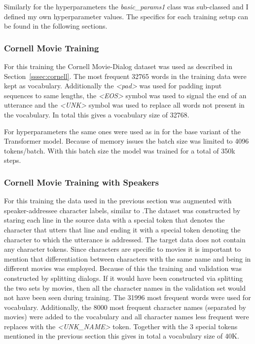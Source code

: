 \documentclass[12pt]{article}
\begin{document}
Similarly for the hyperparameters the \textit{basic}\textit{\_}\textit{params1} class was sub-classed and I defined my own hyperparameter values. The specifics for each training setup can be found in the following sections.

\subsubsection{Cornell Movie Training} \label{sssec:cornell_training}
For this training the Cornell Movie-Dialog dataset was used as described in Section~\ref{sssec:cornell}. The most frequent 32765 words in the training data were kept as vocabulary. Additionally the \textit{\textless pad\textgreater} was used for padding input sequences to same lengths, the \textit{\textless EOS\textgreater} symbol was used to signal the end of an utterance and the \textit{\textless UNK\textgreater} symbol was used to replace all words not present in the vocabulary. In total this gives a vocabulary size of 32768.

For hyperparameters the same ones were used as in \cite{Vaswani:2017} for the base variant of the Transformer model. Because of memory issues the batch size was limited to 4096 tokens/batch. With this batch size the model was trained for a total of 350k steps.
\subsubsection{Cornell Movie Training with Speakers} \label{sssec:cornell_speakers}
For this training the data used in the previous section was augmented with speaker-addressee character labels, similar to \cite{Li:2016}.The dataset was constructed by staring each line in the source data with a special token that denotes the character that utters that line and ending it with a special token denoting the character to which the utterance is addressed. The target data does not contain any character tokens. Since characters are specific to movies it is important to mention that differentiation between characters with the same name and being in different movies was employed. Because of this the training and validation was constructed by splitting dialogs. If it would have been constructed via splitting the two sets by movies, then all the character names in the validation set would not have been seen during training. The 31996 most frequent words were used for vocabulary. Additionally, the 8000 most frequent character names (separated by movies) were added to the vocabulary and all character names less frequent were replaces with the \textit{\textless UNK\_NAME\textgreater} token. Together with the 3 special tokens mentioned in the previous section this gives in total a vocabulary size of 40K.
\end{document}
